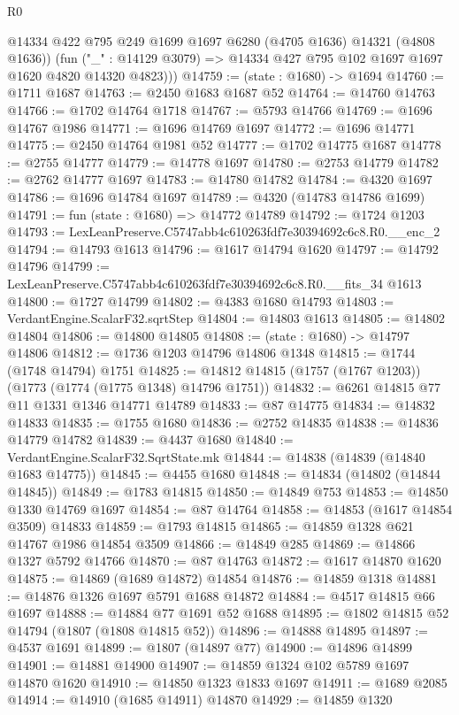 \begin{lexlean}{R0}
\begin{coremodule}
        @14334 @422 @795 @249 @1699 @1697 @6280 (@4705 @1636) @14321 (@4808 @1636))
        (fun ("_" : @14129 @3079) => @14334 @427 @795 @102 @1697 @1697 @1620 @4820 @14320 @4823)))
@14759 := (state : @1680) -> @1694
@14760 := @1711 @1687
@14763 := @2450 @1683 @1687 @52
@14764 := @14760 @14763
@14766 := @1702 @14764 @1718
@14767 := @5793 @14766
@14769 := @1696 @14767 @1986
@14771 := @1696 @14769 @1697
@14772 := @1696 @14771
@14775 := @2450 @14764 @1981 @52
@14777 := @1702 @14775 @1687
@14778 := @2755 @14777
@14779 := @14778 @1697
@14780 := @2753 @14779
@14782 := @2762 @14777 @1697
@14783 := @14780 @14782
@14784 := @4320 @1697
@14786 := @1696 @14784 @1697
@14789 := @4320 (@14783 @14786 @1699)
@14791 := fun (state : @1680) => @14772 @14789
@14792 := @1724 @1203
@14793 := LexLeanPreserve.C5747abb4c610263fdf7e30394692c6c8.R0.__enc_2
@14794 := @14793 @1613
@14796 := @1617 @14794 @1620
@14797 := @14792 @14796
@14799 := LexLeanPreserve.C5747abb4c610263fdf7e30394692c6c8.R0.__fits_34 @1613
@14800 := @1727 @14799
@14802 := @4383 @1680 @14793
@14803 := VerdantEngine.ScalarF32.sqrtStep
@14804 := @14803 @1613
@14805 := @14802 @14804
@14806 := @14800 @14805
@14808 := (state : @1680) -> @14797 @14806
@14812 := @1736 @1203 @14796 @14806 @1348
@14815 := @1744 (@1748 @14794) @1751
@14825 := @14812 @14815 (@1757 (@1767 @1203)) (@1773 (@1774 (@1775 @1348) @14796 @1751))
@14832 := @6261 @14815 @77 @11 @1331 @1346 @14771 @14789
@14833 := @87 @14775
@14834 := @14832 @14833
@14835 := @1755 @1680
@14836 := @2752 @14835
@14838 := @14836 @14779 @14782
@14839 := @4437 @1680
@14840 := VerdantEngine.ScalarF32.SqrtState.mk
@14844 := @14838 (@14839 (@14840 @1683 @14775))
@14845 := @4455 @1680
@14848 := @14834 (@14802 (@14844 @14845))
@14849 := @1783 @14815
@14850 := @14849 @753
@14853 := @14850 @1330 @14769 @1697
@14854 := @87 @14764
@14858 := @14853 (@1617 @14854 @3509) @14833
@14859 := @1793 @14815
@14865 := @14859 @1328 @621 @14767 @1986 @14854 @3509
@14866 := @14849 @285
@14869 := @14866 @1327 @5792 @14766
@14870 := @87 @14763
@14872 := @1617 @14870 @1620
@14875 := @14869 (@1689 @14872) @14854
@14876 := @14859 @1318
@14881 := @14876 @1326 @1697 @5791 @1688 @14872
@14884 := @4517 @14815 @66 @1697
@14888 := @14884 @77 @1691 @52 @1688
@14895 := @1802 @14815 @52 @14794 (@1807 (@1808 @14815 @52))
@14896 := @14888 @14895
@14897 := @4537 @1691
@14899 := @1807 (@14897 @77)
@14900 := @14896 @14899
@14901 := @14881 @14900
@14907 := @14859 @1324 @102 @5789 @1697 @14870 @1620
@14910 := @14850 @1323 @1833 @1697
@14911 := @1689 @2085
@14914 := @14910 (@1685 @14911) @14870
@14929 := @14859
    @1320

\end{coremodule}
\end{lexlean}
